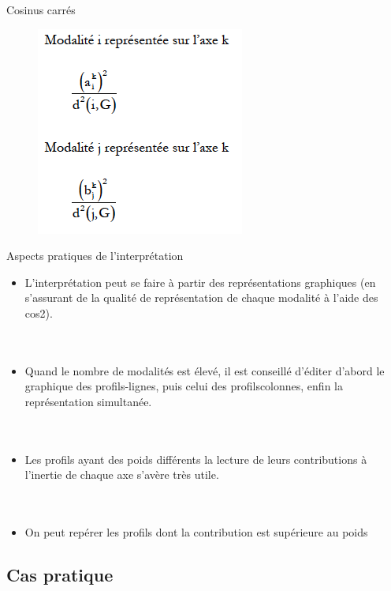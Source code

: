 \documentclass[11pt]{beamer}
\begin{document}
\begin{frame}{Cosinus carrés}
\begin{figure}
\includegraphics[scale=0.6]{exemple17.png}  
\end{figure}

\end{frame}



\begin{frame}{Aspects pratiques de l’interprétation}

\begin{itemize}
\item L’interprétation peut se faire à partir des représentations graphiques (en s’assurant de la qualité de représentation de chaque modalité à
l’aide des cos2).\\~\\~\\
\item Quand le nombre de modalités est élevé, il est conseillé d’éditer d’abord le graphique des profils-lignes, puis celui des profilscolonnes, enfin la représentation simultanée.\\~\\~\\

\item Les profils ayant des poids différents la lecture de leurs
contributions à l’inertie de chaque axe s’avère très utile.\\~\\~\\

\item On peut repérer les profils dont la contribution est supérieure au poids
\end{itemize}
\end{frame}

\subsection{Cas pratique}
\end{document}
